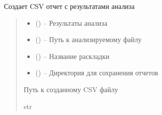 \documentclass[a4paper,11pt,russian,openany,oneside]{sphinxmanual}
\begin{document}
\begin{savenotes}\begin{fulllineitems}
\label{\detokenize{data_module:data_module.make_export_file.create_csv_report}}
\pysigstartsignatures
\pysiglinewithargsret
{}
{\sphinxparamcomma {}\sphinxparamcomma {}\sphinxparamcomma {}}
{}
\pysigstopsignatures
\sphinxAtStartPar
Создает CSV отчет с результатами анализа
\begin{quote}\begin{description}
\begin{itemize}
\item {} 
\sphinxAtStartPar
{} (\sphinxstyleliteralemphasis{\sphinxupquote{{[}}}\sphinxstyleliteralemphasis{\sphinxupquote{, }}\sphinxstyleliteralemphasis{\sphinxupquote{{]}}}) – Результаты анализа

\item {} 
\sphinxAtStartPar
{} () – Путь к анализируемому файлу

\item {} 
\sphinxAtStartPar
{} () – Название раскладки

\item {} 
\sphinxAtStartPar
{} () – Директория для сохранения отчетов

\end{itemize}

\sphinxAtStartPar
Путь к созданному CSV файлу

\sphinxAtStartPar
str

\end{description}\end{quote}

\end{fulllineitems}\end{savenotes}
\end{document}
